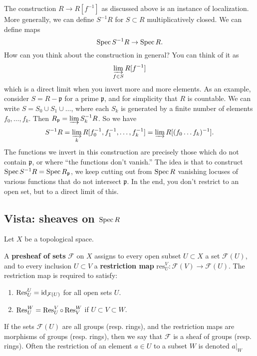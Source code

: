 \begin{remark} 
The construction $R \to R[f^{-1}]$ as discussed above is an
instance of
localization. More generally, we can define $S^{-1}R$ for $S
\subset R$
multiplicatively closed. We can define maps
\[ \operatorname{Spec} S^{-1}R \to \operatorname{Spec} R . \]
How can you think about the construction in general? You can
think of it as
\[ \varinjlim_{f \in S} R[f^{-1}]  \]
which is a direct limit when you invert more and more elements.
As an example, consider $S = R - \mathfrak{p}$ for a prime
$\mathfrak{p}$, and for
simplicity that $R$ is countable. We can write $S =
S_0 \cup S_1 \cup \dots$, where each $S_k$ is generated by a
finite number of
elements $f_0, \dots, f_k$. Then $R_{\mathfrak{p}} = \varinjlim
S_k^{-1} R$.
So we have
\[ S^{-1}R = \varinjlim_k R[f_0^{-1} , f_1^{-1}, \dots, f_k^{-1}
] = \varinjlim
R[(f_0\dots f_k)^{-1}]. \]
The functions we invert in this construction are precisely those
which do not
contain $\mathfrak{p}$, or where ``the functions don't vanish.''
The idea is
that to construct $\operatorname{Spec} S^{-1}R = \operatorname{Spec} R_{\mathfrak{p}}$, we
keep cutting out
from $\operatorname{Spec} R$ vanishing locuses of various functions that do
not
intersect $\mathfrak{p}$. In the end, you don't restrict to an
open set, but
to a direct limit of this.
\end{remark} 

\subsection{Vista: sheaves on $\operatorname{Spec} R$}

Let $X$ be a topological space. 
\begin{definition} 
A \textbf{presheaf of sets} $\mathcal{F}$ on $X$ assigns to
every open subset
$U \subset X$ a set $\mathcal{F} (U)$, and to every inclusion $U
\subset V$ a
\textbf{restriction map}
$\mathrm{res}^V_U : \mathcal{F}(V) \to \mathcal{F}(U)$. The
restriction map is
required to satisfy:
\begin{enumerate}
\item $\operatorname{Res}^U_U = \operatorname{id}_{\mathcal{F}(U)} $ for all open sets $U$.
\item $\operatorname{Res}^W_U = \operatorname{Res}^V_U \circ \operatorname{Res}^W_V $ if $U \subset V
\subset W$.
\end{enumerate}

If the sets $\mathcal{F}(U)$ are all groups (resp. rings), and
the restriction
maps are morphisms of groups (resp. rings), then we say that
$\mathcal{F}$ is a
sheaf of groups (resp. rings). Often the restriction of an
element $a\in U$ to a subset $W$ is denoted $a|_W$
\end{definition} 


